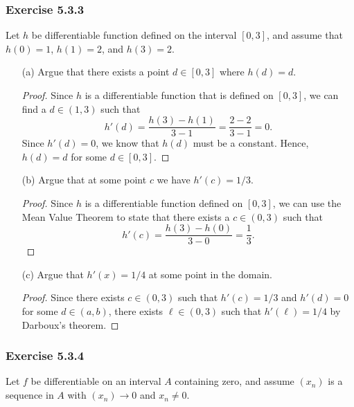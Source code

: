 \subsubsection{Exercise 5.3.3} Let \( h  \) be differentiable function defined on the interval \( [0,3] \), and assume that \( h(0) = 1  \), \( h(1) = 2  \), and \( h(3) = 2  \).
\begin{enumerate}
    \item[(a)] Argue that there exists a point \( d \in [0,3]  \) where \( h(d) = d  \).
        \begin{proof}
            Since \( h  \) is a differentiable function that is defined on \( [0,3] \), we can find a \( d \in (1,3)  \) such that 
            \[  h'(d) = \frac{ h(3) - h(1)  }{ 3 - 1  } = \frac{ 2 - 2  }{ 3 - 1  } = 0. \]
            Since \( h'(d) = 0  \), we know that \( h(d)  \) must be a constant. Hence, \( h(d) = d  \) for some \( d \in [0,3] \).
        \end{proof}
    \item[(b)] Argue that at some point \( c  \) we have \( h'(c) = 1 / 3  \).
        \begin{proof}
            Since \( h  \) is a differentiable function defined on \( [0,3]  \), we can use the Mean Value Theorem to state that there exists a \( c \in (0,3) \) such that 
            \[ h'(c) = \frac{ h(3) - h(0) }{ 3 - 0  } = \frac{ 1 }{ 3 }.  \]
        \end{proof}
    \item[(c)] Argue that \( h'(x) = 1/4 \) at some point in the domain.
        \begin{proof}
            Since there exists \(  c \in (0,3)  \) such that \( h'(c) = 1 / 3  \) and \( h'(d) = 0  \) for some \( d \in(a,b)   \), there exists \( \ell \in (0,3)  \) such that \( h'(\ell) = 1 / 4  \) by Darboux's theorem.
        \end{proof}
\end{enumerate}


\subsubsection{Exercise 5.3.4} Let \( f  \) be differentiable on an interval \( A  \) containing zero, and assume \( (x_n)  \) is a sequence in \( A  \) with \( (x_n) \to 0  \) and \( x_n \neq 0 \).


